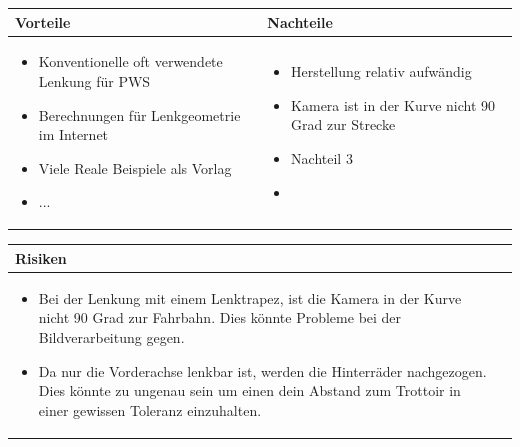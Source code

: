 \begin{table}[h]
\begin{tabular}{p{} | p{}}


 \textbf{Vorteile} & \textbf{Nachteile} \\ \hline
	 
\begin{itemize}
\item Konventionelle oft verwendete Lenkung für PWS
\item Berechnungen für Lenkgeometrie im Internet
\item Viele Reale Beispiele als Vorlag
\item ...
\end{itemize}

 
 &
 
\begin{itemize}
\item Herstellung relativ aufwändig
\item Kamera ist in der Kurve nicht 90 Grad zur Strecke
\item Nachteil 3
\item 
\end{itemize}

\end{tabular}
\end{table}

\begin{table}[h]
\begin{tabular}{p{}p{}}


 \textbf{Risiken} & \\ \hline
	 
\begin{itemize}
\item Bei der Lenkung mit einem Lenktrapez, ist die Kamera in der Kurve nicht 90 Grad zur Fahrbahn. Dies könnte Probleme bei der Bildverarbeitung gegen.
\item Da nur die Vorderachse lenkbar ist, werden die Hinterräder nachgezogen. Dies könnte zu ungenau sein um einen dein Abstand zum Trottoir in einer gewissen Toleranz einzuhalten.
\end{itemize}
&
\begin{itemize}

\end{itemize}

 
\end{tabular}
\end{table}

\pagebreak


